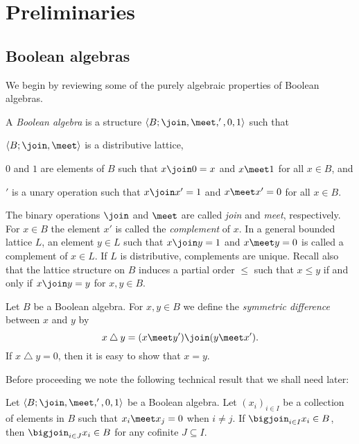 \documentclass[article, a4paper, 11pt, oneside]{memoir}
\numberwithin{equation}{chapter}
\renewcommand{\symdiff}{\mathbin{\triangle}}
\begin{document}
\chapter{Preliminaries}


\section{Boolean algebras}

We begin by reviewing some of the purely algebraic properties of Boolean algebras.

\begin{definition}
    \label{def:Boolean-algebra}
    A \emph{Boolean algebra} is a structure $\langle B; \join, \meet, ', 0, 1 \rangle$ such that
    \begin{enumdef}
        \item $\langle B; \join, \meet \rangle$ is a distributive lattice,
        \item $0$ and $1$ are elements of $B$ such that $x \join 0 = x$ and $x \meet 1$ for all $x \in B$, and
        \item $'$ is a unary operation such that $x \join x' = 1$ and $x \meet x' = 0$ for all $x \in B$.
    \end{enumdef}
\end{definition}
%
The binary operations $\join$ and $\meet$ are called \emph{join} and \emph{meet}, respectively. For $x \in B$ the element $x'$ is called the \emph{complement} of $x$. In a general bounded lattice $L$, an element $y \in L$ such that $x \join y = 1$ and $x \meet y = 0$ is called a complement of $x \in L$. If $L$ is distributive, complements are unique. Recall also that the lattice structure on $B$ induces a partial order $\leq$ such that $x \leq y$ if and only if $x \join y = y$ for $x,y \in B$.

Let $B$ be a Boolean algebra. For $x,y \in B$ we define the \emph{symmetric difference} between $x$ and $y$ by
%
\begin{equation*}
    x \symdiff y
        = (x \meet y') \join (y \meet x').
\end{equation*}
%
If $x \symdiff y = 0$, then it is easy to show that $x = y$.

Before proceeding we note the following technical result that we shall need later:

\begin{lemma}
    \label{thm:refine_join}
    Let $\langle B; \join, \meet, ', 0, 1 \rangle$ be a Boolean algebra. Let $(x_i)_{i \in I}$ be a collection of elements in $B$ such that $x_i \meet x_j = 0$ when $i \neq j$. If $\bigjoin_{i \in I} x_i \in B$, then $\bigjoin_{i \in J} x_i \in B$ for any cofinite\footnotemark{} $J \subseteq I$.
\end{lemma}
\end{document}
